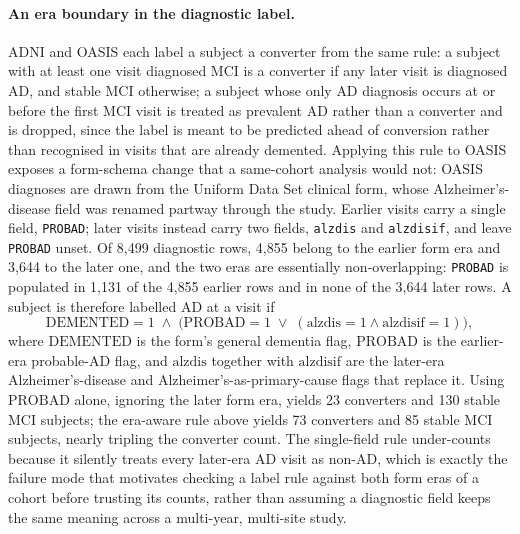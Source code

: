 \paragraph{An era boundary in the diagnostic label.} \ac{ADNI} and \ac{OASIS} each label a
subject a converter from the same rule: a subject with at least one visit diagnosed
\ac{MCI} is a converter if any later visit is diagnosed \ac{AD}, and stable \ac{MCI}
otherwise; a subject whose only \ac{AD} diagnosis occurs at or before the first \ac{MCI}
visit is treated as prevalent \ac{AD} rather than a converter and is dropped, since the
label is meant to be predicted ahead of conversion rather than recognised in visits that
are already demented.
Applying this rule to \ac{OASIS} exposes a form-schema change that a same-cohort analysis
would not: \ac{OASIS} diagnoses are drawn from the Uniform Data Set clinical form, whose
Alzheimer's-disease field was renamed partway through the study. Earlier visits carry a
single field, \texttt{PROBAD}; later visits instead carry two fields, \texttt{alzdis} and
\texttt{alzdisif}, and leave \texttt{PROBAD} unset. Of 8{,}499 diagnostic rows, 4{,}855
belong to the earlier form era and 3{,}644 to the later one, and the two eras are
essentially non-overlapping: \texttt{PROBAD} is populated in 1{,}131 of the 4{,}855 earlier
rows and in none of the 3{,}644 later rows. A subject is therefore labelled \ac{AD} at a
visit if
\[
  \text{DEMENTED} = 1 \;\wedge\; \bigl(\text{PROBAD} = 1 \;\vee\; (\text{alzdis} = 1 \wedge \text{alzdisif} = 1)\bigr),
\]
where $\text{DEMENTED}$ is the form's general dementia flag, $\text{PROBAD}$ is the
earlier-era probable-\ac{AD} flag, and $\text{alzdis}$ together with $\text{alzdisif}$ are
the later-era Alzheimer's-disease and Alzheimer's-as-primary-cause flags that replace it.
Using $\text{PROBAD}$ alone, ignoring the later form era, yields 23 converters and 130
stable \ac{MCI} subjects; the era-aware rule above yields 73 converters and 85 stable
\ac{MCI} subjects, nearly tripling the converter count. The single-field rule under-counts
because it silently treats every later-era \ac{AD} visit as non-\ac{AD}, which is exactly
the failure mode that motivates checking a label rule against both form eras of a cohort
before trusting its counts, rather than assuming a diagnostic field keeps the same meaning
across a multi-year, multi-site study.


